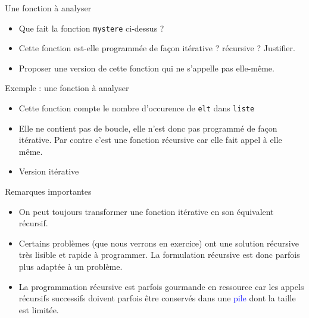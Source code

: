 \documentclass[10pt]{beamer}
\begin{document}
\begin{frame}{\Ctitle}{\stitle}
	\begin{exampleblock}{Une fonction à analyser}
		\begin{itemize}
			\item<2-> Que fait la fonction {\tt mystere} ci-dessus ?
			\item<3-> Cette fonction est-elle programmée de façon itérative ? récursive ? Justifier.
			\item<4-> Proposer une version de cette fonction qui ne s'appelle pas elle-même.
		\end{itemize}
	\end{exampleblock}
\end{frame}

\begin{frame}{\Ctitle}{\stitle}
	\begin{exampleblock}{Exemple : une fonction à analyser}
		\begin{itemize}
			\item<2-> \textcolor{OliveGreen}{Cette fonction compte le nombre d'occurence de {\tt elt} dans {\tt liste}}
			\item<3-> \textcolor{OliveGreen}{Elle ne contient pas de boucle, elle n'est donc pas programmé de façon itérative. Par contre c'est une fonction récursive car elle fait appel à elle même.}
			\item<4-> \textcolor{OliveGreen}{Version itérative}
		\end{itemize}
	\end{exampleblock}
\end{frame}

\begin{frame}{\Ctitle}{\stitle}
	\begin{block}{Remarques importantes}
		\begin{itemize}
			\item<2-> On peut toujours transformer une fonction itérative en son équivalent récursif.
			\item<3-> Certains problèmes (que nous verrons en exercice) ont une solution récursive très lisible et rapide à programmer. La formulation récursive est donc parfois \og plus adaptée \fg à un problème.
			\item<4-> La programmation récursive est parfois gourmande en ressource car les appels récursifs successifs doivent parfois être conservés dans une \textcolor{blue}{pile} dont la taille est limitée.
		\end{itemize}
	\end{block}
\end{frame}
\end{document}
